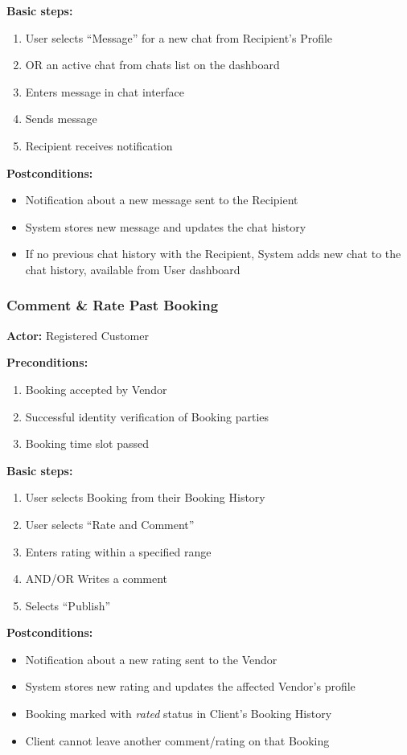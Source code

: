 \documentclass[11pt,a4paper]{article}
\begin{document}
\noindent \textbf{Basic steps:}
\begin{enumerate}
  \item User selects ``Message'' for a new chat from Recipient's Profile
  \item OR an active chat from chats list on the dashboard
  \item Enters message in chat interface
  \item Sends message
  \item Recipient receives notification
\end{enumerate}

\noindent \textbf{Postconditions:}
\begin{itemize}
  \item Notification about a new message sent to the Recipient
  \item System stores new message and updates the chat history
  \item If no previous chat history with the Recipient, System adds
    new chat to the chat history, available from User dashboard
\end{itemize}

\subsubsection{Comment \& Rate Past Booking }

\textbf{Actor:} Registered Customer

\noindent \textbf{Preconditions:}
\begin{enumerate}
  \item Booking accepted by Vendor
  \item Successful identity verification of Booking parties
  \item Booking time slot passed
\end{enumerate}

\noindent \textbf{Basic steps:}
\begin{enumerate}
  \item User selects Booking from their Booking History
  \item User selects ``Rate and Comment''
  \item Enters rating within a specified range
  \item AND/OR Writes a comment
  \item Selects ``Publish''
\end{enumerate}

\noindent \textbf{Postconditions:}
\begin{itemize}
  \item Notification about a new rating sent to the Vendor
  \item System stores new rating and updates the affected Vendor's profile
  \item Booking marked with \textit{rated} status in Client's Booking History
  \item Client cannot leave another comment/rating on that Booking
\end{itemize}
\end{document}
